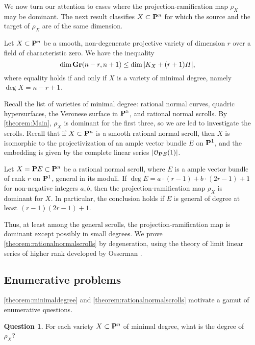 \documentclass[11pt,reqno]{amsart}
\theoremstyle{plain}
\theoremstyle{definition}
\newtheorem{question}[theorem]{Question}
\theoremstyle{remark}
\numberwithin{equation}{section}
\numberwithin{equation}{section}
\renewcommand{\O}{\mathcal O}
\begin{document}
We now turn our attention to cases where the projection-ramification map $\rho_X$ may be dominant.
The next result classifies $X \subset \P^n$ for which the source and the target of $\rho_X$ are of the same dimension.
\begin{maintheorem}\label{theorem:minimaldegree}
  Let $X \subset \P^{n}$ be a smooth, non-degenerate projective variety of dimension $r$ over a field of characteristic zero.
  We have the inequality
  \[ \dim \Gr(n-r, n+1) \leq \dim |K_X + (r+1)H|,\]
  where equality holds if and only if $X$ is a variety of minimal degree, namely $\deg X = n-r+1$.
\end{maintheorem}
Recall the list of varieties of minimal degree: rational normal curves, quadric hypersurfaces, the Veronese surface in $\P^5$, and rational normal scrolls.
By \autoref{theorem:Main}, $\rho_X$ is dominant for the first three, so we are led to investigate the scrolls.
Recall that if $X \subset \P^n$ is a smooth rational normal scroll, then $X$ is isomorphic to the projectivization of an ample vector bundle $E$ on $\P^1$, and the embedding is given by the complete linear series $|\O_{\P E}(1)|$.
\begin{maintheorem}
  \label{theorem:rationalnormalscrolls}
  Let $X = \P E \subset \P^n$ be a rational normal scroll, where $E$ is a ample vector bundle of rank $r$ on $\P^1$, general in its moduli.
  If $\deg E = a \cdot (r-1) + b \cdot (2r-1) + 1$ for non-negative integers $a, b$, then the projection-ramification map $\rho_X$ is dominant for $X$.
  In particular, the conclusion holds if $E$ is general of degree at least $(r-1)(2r-1) + 1$.
\end{maintheorem}
Thus, at least among the general scrolls, the projection-ramification map is dominant except possibly in small degrees.
We prove \autoref{theorem:rationalnormalscrolls} by degeneration, using the theory of limit linear series of higher rank developed by Osserman \cite{oss:14}.

\subsection{Enumerative problems}
\autoref{theorem:minimaldegree} and \autoref{theorem:rationalnormalscrolls} motivate a gamut of enumerative questions.
\begin{question}\label{q:degree}
  For each variety $X \subset \P^n$ of minimal degree, what is the degree of $\rho_X$?
\end{question}
\end{document}
